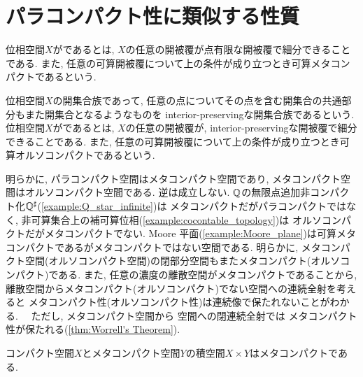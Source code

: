 \documentclass[uplatex, dvipdfmx, a4paper, 12pt, class=jsbook, crop=false]{standalone}
\begin{document}
\section{パラコンパクト性に類似する性質}
\label{sec:paracompact-like-properties}

\begin{definition}
	位相空間$ X $がであるとは, 
	$ X $の任意の開被覆が点有限な開被覆で細分できることである.
	また, 任意の可算開被覆について上の条件が成り立つとき可算メタコンパクトであるという.
\end{definition}

\begin{definition}
	位相空間$ X $の開集合族であって, 任意の点についてその点を含む開集合の共通部分もまた開集合となるようなものを
	interior-preservingな開集合族であるという.
	位相空間$ X $がであるとは, 
	$ X $の任意の開被覆が, interior-preservingな開被覆で細分できることである. 
	また, 任意の可算開被覆について上の条件が成り立つとき可算オルソコンパクトであるという.
\end{definition}

明らかに, パラコンパクト空間はメタコンパクト空間であり, メタコンパクト空間はオルソコンパクト空間である. 
逆は成立しない. $ \mathbb{Q} $の無限点追加非コンパクト化$ \mathbb{Q}^\sharp $(\ref{example:Q_star_infinite})は
メタコンパクトだがパラコンパクトではなく, 非可算集合上の補可算位相(\ref{example:cocontable_topology})は
オルソコンパクトだがメタコンパクトでない. 
Moore 平面(\ref{example:Moore_plane})は可算メタコンパクトであるがメタコンパクトではない空間である. 
明らかに, メタコンパクト空間(オルソコンパクト空間)の閉部分空間もまたメタコンパクト(オルソコンパクト)である. 
また, 任意の濃度の離散空間がメタコンパクトであることから, 
離散空間からメタコンパクト(オルソコンパクト)でない空間への連続全射を考えると
メタコンパクト性(オルソコンパクト性)は連続像で保たれないことがわかる.　
ただし, メタコンパクト空間から \Hausdorff 空間への閉連続全射では
メタコンパクト性が保たれる(\ref{thm:Worrell's Theorem}).

\begin{proposition}
	コンパクト空間$ X $とメタコンパクト空間$ Y $の積空間$ X \times Y $はメタコンパクトである.
\end{proposition}
\end{document}
